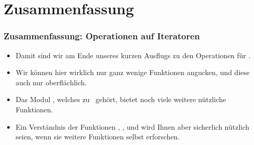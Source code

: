 \documentclass[aspectratio=169,mathserif,notheorems]{beamer}%
\begin{document}
\section{Zusammenfassung}%
%
\begin{frame}%
\frametitle{Zusammenfassung: Operationen auf Iteratoren}%
%
\begin{itemize}%
\item Damit sind wir am Ende unseres kurzen Ausflugs zu den Operationen für .%
%
\item<2-> Wir können hier wirklich nur ganz wenige Funktionen angucken, und diese auch nur oberflächlich.%
%
\item<3-> Das Modul , welches zu \python\ gehört, bietet noch viele weitere nützliche Funktionen.%
%
\item<4-> Ein Verständnis der Funktionen , , und  wird Ihnen aber sicherlich nützlich seien, wenn sie weitere Funktionen selbst erforschen.%
\end{itemize}%
\end{frame}%
%
\end{document}
